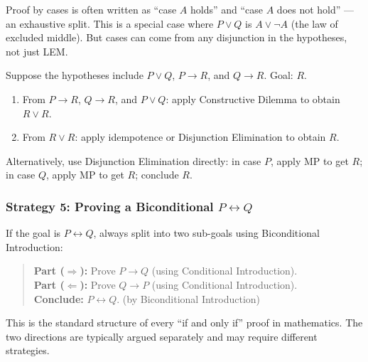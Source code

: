\begin{remark}
Proof by cases is often written as ``case $A$ holds'' and ``case $A$ does not
hold'' — an exhaustive split. This is a special case where $P \vee Q$ is
$A \vee \neg A$ (the law of excluded middle). But cases can come from any
disjunction in the hypotheses, not just LEM.
\end{remark}

\begin{example}
Suppose the hypotheses include $P \vee Q$, $P \to R$, and $Q \to R$.
Goal: $R$.

\begin{enumerate}
\item From $P \to R$, $Q \to R$, and $P \vee Q$: apply Constructive Dilemma
  to obtain $R \vee R$.
\item From $R \vee R$: apply idempotence or Disjunction Elimination to obtain $R$.
\end{enumerate}

Alternatively, use Disjunction Elimination directly: in case $P$, apply MP to
get $R$; in case $Q$, apply MP to get $R$; conclude $R$.
\end{example}


\subsubsection*{Strategy 5: Proving a Biconditional $P \leftrightarrow Q$}

If the goal is $P \leftrightarrow Q$, always split into two sub-goals using
Biconditional Introduction:

\begin{quote}
\textbf{Part ($\Rightarrow$):} Prove $P \to Q$ (using Conditional Introduction).\\
\textbf{Part ($\Leftarrow$):} Prove $Q \to P$ (using Conditional Introduction).\\
\textbf{Conclude:} $P \leftrightarrow Q$. \quad (by Biconditional Introduction)
\end{quote}

This is the standard structure of every ``if and only if'' proof in mathematics.
The two directions are typically argued separately and may require different
strategies.

